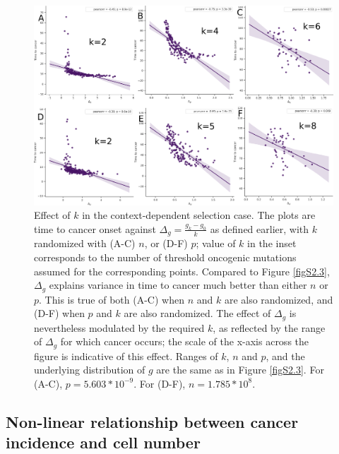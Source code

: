 \documentclass[10pt,twocolumn,twoside]{article}
\begin{document}
		\begin{figure}[tbhp]
			\centering
			\includegraphics[width=\linewidth, keepaspectratio=true]{figS2-4.png}
			\caption{Effect of $k$ in the context-dependent selection case. The plots are time to cancer onset against $\Delta_{g} = \frac{g_{k}-g_{0}}{k}$ as defined earlier, with $k$ randomized with (A-C) $n$, or (D-F) $p$; value of $k$ in the inset corresponds to the number of threshold oncogenic mutations assumed for the corresponding points. Compared to Figure \ref{figS2.3}, $\Delta_{g}$ explains variance in time to cancer much better than either $n$ or $p$. This is true of both (A-C) when $n$ and $k$ are also randomized, and (D-F) when $p$ and $k$ are also randomized. The effect of $\Delta_{g}$ is nevertheless modulated by the required $k$, as reflected by the range of $\Delta_{g}$ for which cancer occurs; the scale of the x-axis across the figure is indicative of this effect. Ranges of $k$, $n$ and $p$, and the underlying distribution of $g$ are the same as in Figure \ref{figS2.3}. For (A-C), $p=5.603*10^{-9}$. For (D-F), $n=1.785*10^{8}$.}
			\label{figS2.4}
		\end{figure}

	\subsection{Non-linear relationship between cancer incidence and cell number}\label{S3 Text}
		\renewcommand{\thefigure}{S3.\arabic{figure}}
		\setcounter{figure}{0}

		\renewcommand{\thetable}{S3.\arabic{table}}
		\setcounter{table}{0}
\end{document}

